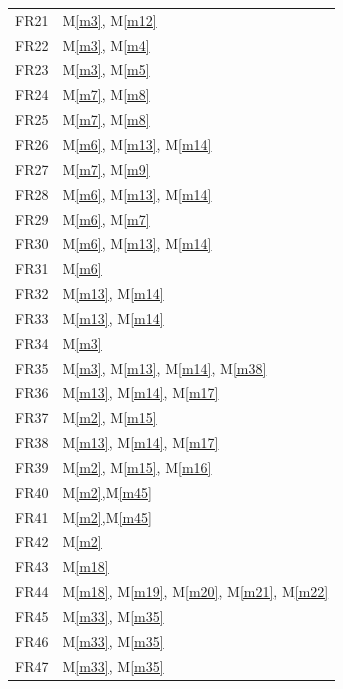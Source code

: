 \documentclass[12pt, titlepage]{article}
\newcommand{\mref}[1]{M\ref{#1}}
\begin{document}
\begin{longtable}{p{} p{}}
			FR21 & \mref{m3}, \mref{m12} \\
			FR22 & \mref{m3}, \mref{m4} \\
			FR23 & \mref{m3}, \mref{m5} \\
			\hline 
			\newpage
			\hline
			FR24 & \mref{m7}, \mref{m8} \\
			FR25 & \mref{m7}, \mref{m8} \\
			FR26 & \mref{m6}, \mref{m13}, \mref{m14}\\
			FR27 & \mref{m7}, \mref{m9}\\
			FR28 & \mref{m6}, \mref{m13}, \mref{m14}\\
			FR29 & \mref{m6}, \mref{m7}\\
			FR30 & \mref{m6}, \mref{m13}, \mref{m14}\\
			FR31 & \mref{m6} \\
			FR32 & \mref{m13}, \mref{m14}\\
			FR33 & \mref{m13}, \mref{m14}\\
			FR34 & \mref{m3}\\
			FR35 & \mref{m3}, \mref{m13}, \mref{m14}, \mref{m38} \\
			FR36 & \mref{m13}, \mref{m14}, \mref{m17} \\
			FR37 & \mref{m2}, \mref{m15} \\
			FR38 & \mref{m13}, \mref{m14},  \mref{m17} \\
			FR39 & \mref{m2}, \mref{m15}, \mref{m16} \\
			FR40 & \mref{m2},\mref{m45} \\
			FR41 & \mref{m2},\mref{m45} \\
			FR42 & \mref{m2} \\
			FR43 & \mref{m18} \\
			FR44 & \mref{m18}, \mref{m19}, \mref{m20}, \mref{m21}, \mref{m22} \\
			FR45 & \mref{m33}, \mref{m35} \\
			FR46 & \mref{m33}, \mref{m35} \\
			FR47 & \mref{m33}, \mref{m35} \\
			\bottomrule
		\end{longtable}
	\newpage
	
\end{document}
